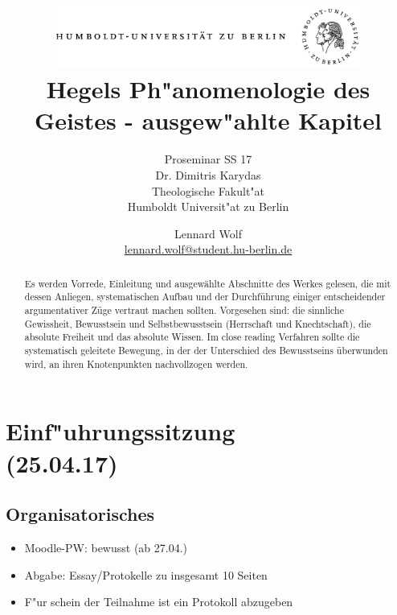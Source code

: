 \documentclass[emulatestandardclasses]{scrartcl}
\date{\vspace{-3ex}}
\begin{document}
\title{
	\includegraphics*[width=0.75\textwidth]{ErstesSem/images/hu_logo.png}\\
	\vspace{24pt}
	Hegels Ph"anomenologie des Geistes - ausgew"ahlte Kapitel}
\subtitle{Proseminar SS 17\\
          Dr. Dimitris Karydas\\
          Theologische Fakult"at \\ 
          Humboldt Universit"at zu Berlin}
\author{Lennard Wolf\\
        \small{\href{mailto:lennard.wolf@student.hu-berlin.de}{lennard.wolf@student.hu-berlin.de}}}
\maketitle
\begin{abstract}

Es werden Vorrede, Einleitung und ausgewählte Abschnitte des Werkes gelesen, die mit dessen Anliegen, systematischen Aufbau und der Durchführung einiger entscheidender argumentativer Züge vertraut machen sollten. Vorgesehen sind: die sinnliche Gewissheit, Bewusstsein und Selbstbewusstsein (Herrschaft und Knechtschaft), die absolute Freiheit und das absolute Wissen. Im close reading Verfahren sollte die systematisch geleitete Bewegung, in der der Unterschied des Bewusstseins überwunden wird, an ihren Knotenpunkten nachvollzogen werden.
\end{abstract}
\newpage

\tableofcontents
\listoffigures
\newpage


\section{Einf"uhrungssitzung\\(25.04.17)}

\subsection{Organisatorisches}

\begin{itemize}
  \item Moodle-PW: bewusst (ab 27.04.)
  \item Abgabe: Essay/Protokelle zu insgesamt 10 Seiten
  \item F"ur schein der Teilnahme ist ein Protokoll abzugeben
\end{itemize}
\end{document}
